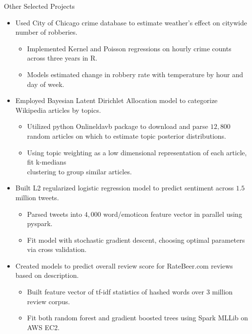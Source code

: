 \documentclass{resume} %
\begin{document}
\begin{rSection}{Other Selected Projects}
    \begin{itemize}
        \item Used City of Chicago crime database to estimate weather's effect on citywide number of robberies.
            \begin{itemize} 
                \item Implemented Kernel and Poisson regressions on hourly crime counts across three years in R.
                \item Models estimated change in robbery rate with temperature by hour and day of week.
            \end{itemize}
        \item Employed Bayesian Latent Dirichlet Allocation model to categorize Wikipedia articles by topics.
            \begin{itemize} 
                \item Utilized python Onlineldavb package to download and parse $12,\!800$ random articles on which to estimate topic posterior distributions.   
                \item Using topic weighting as a low dimensional representation of each article, fit k-medians \\clustering to group similar articles.
            \end{itemize}
        \item Built L2 regularized logistic regression model to predict sentiment across $1.5$ million tweets.
            \begin{itemize} 
                \item Parsed tweets into $4,\!000$ word/emoticon feature vector in parallel using pyspark.
                \item Fit model with stochastic gradient descent, choosing optimal parameters via cross validation.
            \end{itemize}
        \item Created models to predict overall review score for RateBeer.com reviews based on description.
            \begin{itemize} 
                \item Built feature vector of tf-idf statistics of hashed words over 3 million review corpus.
                \item Fit both random forest and gradient boosted trees using Spark MLLib on AWS EC2.
            \end{itemize}

    \end{itemize} 
\end{rSection}
\end{document}
